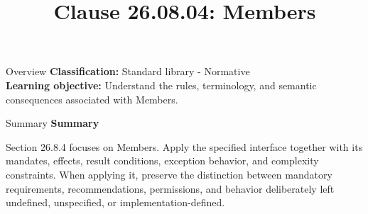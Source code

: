 \documentclass[10pt,letterpaper]{article}
\title{Clause 26.08.04: Members}
\author{}
\date{}
\begin{document}
\maketitle
\begin{CornellOverviewBox}{Overview}
\textbf{Classification:} Standard library - Normative\\[2pt]
\textbf{Learning objective:} Understand the rules, terminology, and semantic consequences associated with Members.
\end{CornellOverviewBox}\begin{CornellSummaryBox}{Summary}
{\sffamily\bfseries\color{Accent} Summary}\par\vspace{3pt}Section 26.8.4 focuses on Members. Apply the specified interface together with its mandates, effects, result conditions, exception behavior, and complexity constraints. When applying it, preserve the distinction between mandatory requirements, recommendations, permissions, and behavior deliberately left undefined, unspecified, or implementation-defined.
\end{CornellSummaryBox}
\end{document}
